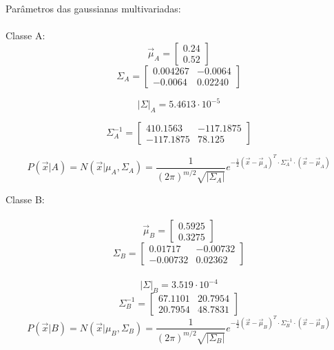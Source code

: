 \documentclass[a4paper,12pt]{article} %
\begin{document}
\begin{enumerate}
\begin{enumerate}
Parâmetros das gaussianas multivariadas: \\ \\
Classe A:
\begin{equation*} 
    \vec{\mu}_A = \begin{bmatrix} 0.24 \\ 0.52 \end{bmatrix} 
\end{equation*}
\begin{equation*} 
    \Sigma_A = \begin{bmatrix} 0.004267 & -0.0064 \\ -0.0064 & 0.02240 \end{bmatrix}
\end{equation*}

\begin{equation*} 
    |\Sigma|_A = 5.4613 \cdot 10^{-5}
\end{equation*}

\begin{equation*} 
\Sigma^{-1}_A = \begin{bmatrix} 410.1563 & -117.1875 \\ -117.1875 & 78.125 \end{bmatrix}
\end{equation*}

\begin{equation*}
    P(\vec{x}|A) = N(\vec{x}|\mu_{A},\Sigma_{A}) = \frac{1}{(2\pi)^{m/2} \sqrt{|\Sigma_{A}|}}e^{-\frac{1}{2}(\vec{x}-\vec{\mu}_A)^T \cdot \Sigma_A^{-1} \cdot (\vec{x}-\vec{\mu}_A)}
\end{equation*}

Classe B: \\ \\ 
\begin{equation*}
    \vec{\mu}_B = \begin{bmatrix} 0.5925 \\ 0.3275 \end{bmatrix}  
\end{equation*}
\begin{equation*}
    \Sigma_B = \begin{bmatrix} 0.01717 & -0.00732 \\ -0.00732 & 0.02362 \end{bmatrix} 
\end{equation*} \\
\begin{equation*}
    |\Sigma|_B = 3.519 \cdot 10^{-4} 
\end{equation*}
\begin{equation*}
    \Sigma^{-1}_B = \begin{bmatrix} 67.1101 & 20.7954 \\ 20.7954 & 48.7831 \end{bmatrix}
\end{equation*}
\begin{equation*}
    P(\vec{x}|B) = N(\vec{x}|\mu_{B},\Sigma_{B}) = \frac{1}{(2\pi)^{m/2} \sqrt{|\Sigma_{B}|}}e^{-\frac{1}{2}(\vec{x}-\vec{\mu}_B)^T \cdot \Sigma_B^{-1} \cdot (\vec{x}-\vec{\mu}_B)}
\end{equation*}



\end{enumerate}
\end{enumerate}
\end{document}
